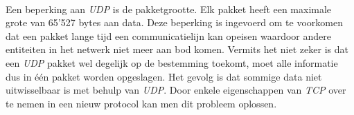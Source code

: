 \paragraph{}
Een beperking aan \emph{UDP} is de pakketgrootte. Elk pakket heeft een maximale grote van 65'527 bytes aan data. Deze beperking is ingevoerd om te voorkomen dat een pakket lange tijd een communicatielijn kan opeisen waardoor andere entiteiten in het netwerk niet meer aan bod komen\cite{Tanen2003}. Vermits het niet zeker is dat een \emph{UDP} pakket wel degelijk op de bestemming toekomt, moet alle informatie dus in \'e\'en pakket worden opgeslagen. Het gevolg is dat sommige data niet uitwisselbaar is met behulp van \emph{UDP}. Door enkele eigenschappen van \emph{TCP} over te nemen in een nieuw protocol kan men dit probleem oplossen.